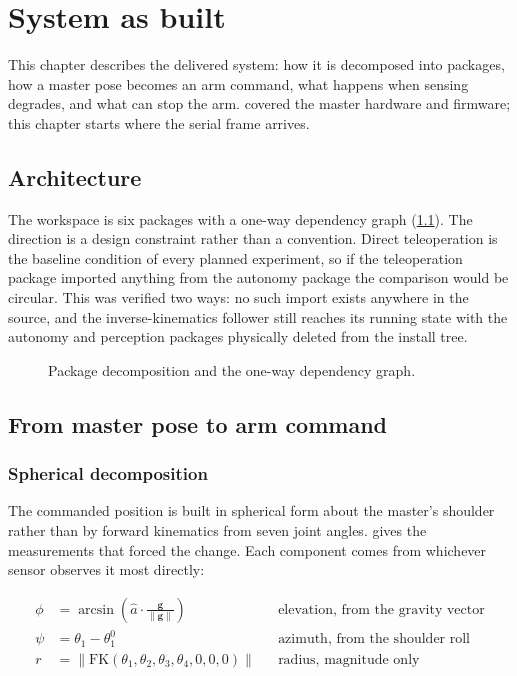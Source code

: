 \chapter{System as built}
\label{ch:method}

This chapter describes the delivered system: how it is decomposed into
packages, how a master pose becomes an arm command, what happens when sensing
degrades, and what can stop the arm.  covered the master
hardware and firmware; this chapter starts where the serial frame arrives.

\section{Architecture}

The workspace is six packages with a one-way dependency
graph (\cref{fig:arch}). The direction is a design constraint rather than a
convention. Direct teleoperation is the baseline condition of every planned
experiment, so if the teleoperation package imported anything from the
autonomy package the comparison would be circular. This was verified two ways:
no such import exists anywhere in the source, and the inverse-kinematics
follower still reaches its running state with the autonomy and perception
packages physically deleted from the install tree.

\begin{figure}[htbp]
  \centering
  
  \caption[Package architecture]{Package decomposition and the one-way
  dependency graph.}
  \label{fig:arch}
\end{figure}

\section{From master pose to arm command}

\subsection{Spherical decomposition}

The commanded position is built in spherical form about the master's shoulder
rather than by forward kinematics from seven joint angles.
 gives the measurements that forced the change. Each
component comes from whichever sensor observes it most directly:

\begin{align}
  \phi &= \arcsin\!\left(\hat{a} \cdot \frac{\mathbf{g}}{\lVert\mathbf{g}\rVert}\right)
    &&\text{elevation, from the gravity vector} \label{eq:elev}\\
  \psi &= \theta_1 - \theta_1^{0}
    &&\text{azimuth, from the shoulder roll} \label{eq:azim}\\
  r &= \bigl\lVert \mathrm{FK}(\theta_1, \theta_2, \theta_3, \theta_4, 0, 0, 0) \bigr\rVert
    &&\text{radius, magnitude only} \label{eq:reach}
\end{align}

